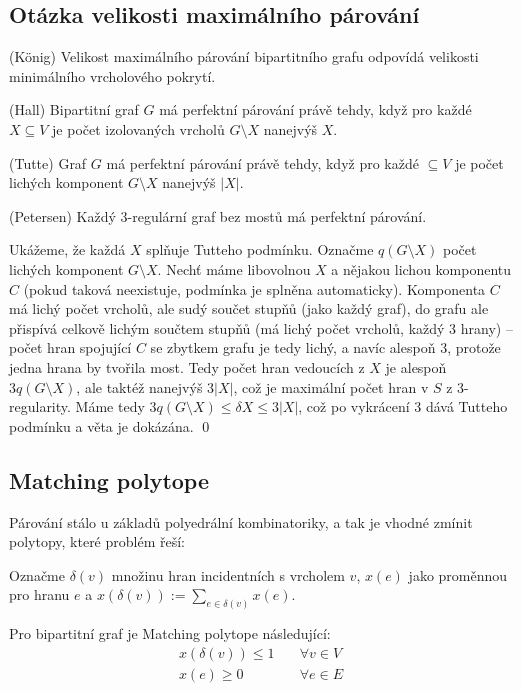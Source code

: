 \subsection{Otázka velikosti maximálního párování}

\vt (König) Velikost maximálního párování bipartitního grafu odpovídá velikosti 
minimálního vrcholového pokrytí.

\vt (Hall) Bipartitní graf $G$ má perfektní párování právě tehdy, když pro každé
$X \subseteq V$ je počet izolovaných vrcholů $G \setminus X$ nanejvýš $X$.

\vt (Tutte) Graf $G$ má perfektní párování právě tehdy, když pro každé $ 
\subseteq V$ je počet lichých komponent $G \setminus X$ nanejvýš $|X|$.

\vt (Petersen) Každý 3-regulární graf bez mostů má perfektní párování.

\dk Ukážeme, že každá $X$ splňuje Tutteho podmínku. Označme $q(G \setminus X)$ 
počet lichých komponent $G \setminus X$. Nechť máme libovolnou $X$ a nějakou 
lichou komponentu $C$ (pokud taková neexistuje, podmínka je splněna 
automaticky).  Komponenta $C$ má lichý počet vrcholů, ale sudý součet stupňů 
(jako každý graf), do grafu ale přispívá celkově lichým součtem stupňů (má lichý 
počet vrcholů, každý 3 hrany) -- počet hran spojující $C$ se zbytkem grafu je 
tedy lichý, a navíc alespoň $3$, protože jedna hrana by tvořila most. Tedy počet
hran vedoucích z $X$ je alespoň $3q(G \setminus X)$, ale taktéž nanejvýš $3|X|$,
což je maximální počet hran v $S$ z $3$-regularity. Máme tedy $3q(G \setminus X)
\leq\delta X \leq 3|X|$, což po vykrácení $3$ dává Tutteho podmínku a věta je 
dokázána. \qed


\subsection{Matching polytope}

Párování stálo u základů polyedrální kombinatoriky, a tak je vhodné zmínit 
polytopy, které problém řeší:

\df Označme $\delta(v)$ množinu hran incidentních s vrcholem $v$, $x(e)$ jako 
proměnnou pro hranu $e$ a $x(\delta(v)) := \sum_{e \in\delta(v)} x(e)$.

\tv Pro bipartitní graf je Matching polytope následující:
\begin{align}
	x(\delta(v)) \leq 1  & \quad  \forall v \in V \\
	x(e) \geq 0 & \quad \forall e  \in E
\end{align}

